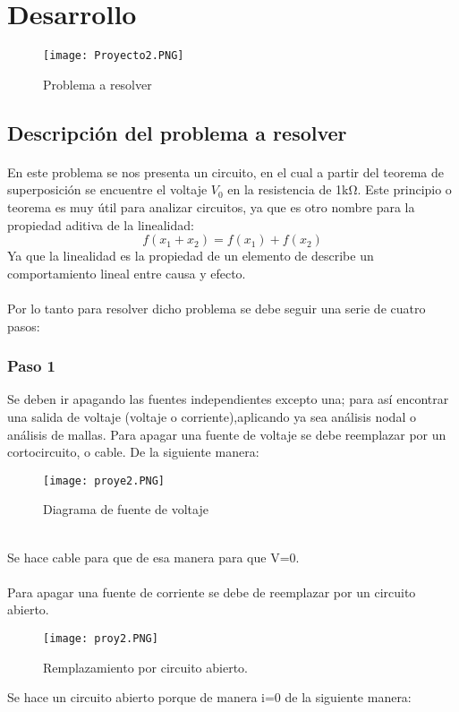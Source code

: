 \documentclass[12pt]{article}
\begin{document}
\section{Desarrollo}\label{results}

\begin{figure}[hbtp]
\caption{Problema a resolver}
\centering
\texttt{[image: Proyecto2.PNG]}
\end{figure}
\subsection*{Descripción del problema a resolver}
\paragraph{}En este problema se nos presenta un circuito, en el cual a partir del teorema de superposición se encuentre el voltaje $V_{0}$ en la resistencia de 1kΩ.
Este principio o teorema es muy útil para analizar circuitos, ya que es otro nombre para la  propiedad aditiva de la linealidad:
\[ 
f(x_{1}+x_{2})=f(x_{1})+f(x_{2})
\]
Ya que la linealidad es la propiedad de un elemento de describe un comportamiento lineal entre causa y efecto.\\ \\Por lo tanto para resolver dicho problema se debe seguir una serie de cuatro pasos: 
\subsubsection*{Paso 1}
Se deben ir apagando las fuentes independientes excepto una; para así encontrar una salida de voltaje (voltaje o corriente),aplicando ya sea análisis nodal o análisis de mallas. 
Para apagar una fuente de voltaje se debe reemplazar por un cortocircuito, o cable. De la siguiente manera:
\begin{figure}[hbtp]
\caption{Diagrama de fuente de voltaje}
\centering
\texttt{[image: proye2.PNG]}
\end{figure}
\\Se hace cable  para que de esa manera para que V=0.
\\ \\ Para apagar una fuente de corriente se debe de reemplazar por un circuito abierto. 
\begin{figure}[hbtp]
\caption{Remplazamiento por circuito abierto.}
\centering
\texttt{[image: proy2.PNG]}
\end{figure}
Se hace un circuito abierto porque de manera i=0 de la siguiente manera:
\\
\end{document}
